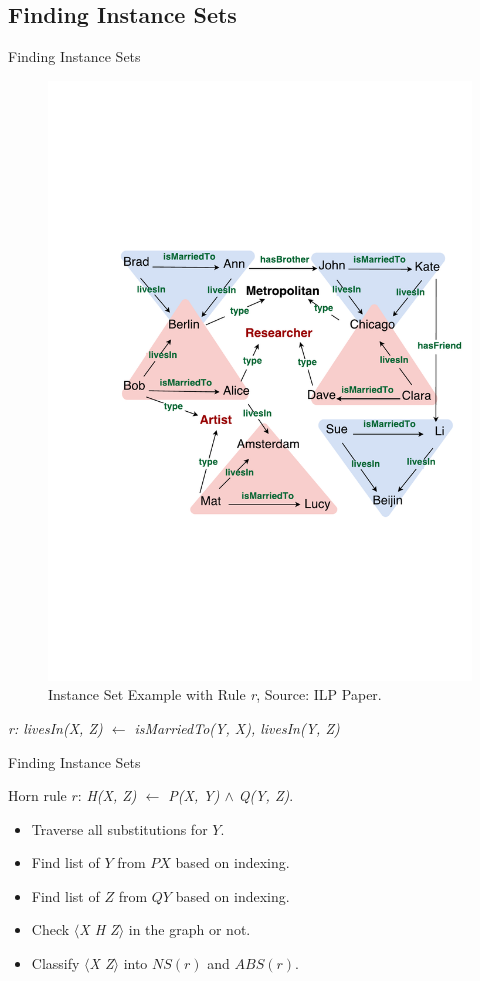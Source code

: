 \documentclass{beamer}
\begin{document}
\subsection{Finding Instance Sets}

\begin{frame}{Finding Instance Sets}

\begin{figure}[h]
	\centering
	\includegraphics[page=1,width=.5\textwidth]{example.pdf}
	\caption{Instance Set Example with Rule \textit{r}, Source: ILP Paper.}
\end{figure}

\centerline{\textit{r: livesIn(X, Z) $\leftarrow$ isMarriedTo(Y, X), livesIn(Y, Z)}}

\end{frame}

\begin{frame}{Finding Instance Sets}

Horn rule $r$: \textit{H(X, Z) $\leftarrow$ P(X, Y) $\wedge$ Q(Y, Z)}.
\begin{itemize}
	\item Traverse all substitutions for $Y$.
	\item Find list of $Y$ from $PX$ based on indexing.
	\item Find list of $Z$ from $QY$ based on indexing.
	\item Check \textit{$\langle$X H Z$\rangle$} in the graph or not.
	\item Classify \textit{$\langle$X Z$\rangle$} into $NS(r)$ and $ABS(r)$.
\end{itemize}

\end{frame}
\end{document}
